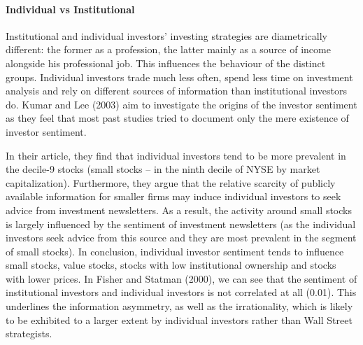 \paragraph{Individual vs Institutional}
Institutional and individual investors' investing strategies are diametrically different: the former as a profession, the latter mainly as a source of income alongside his professional job. This influences the behaviour of the distinct groups. Individual investors trade much less often, spend less time on investment analysis and rely on different sources of information than institutional investors do. Kumar and Lee (2003) aim to investigate the origins of the investor sentiment as they feel that most past studies tried to document only the mere existence of investor sentiment. 
\par
In their article, they find that individual investors tend to be more prevalent in the decile-9 stocks (small stocks – in the ninth decile of NYSE by market capitalization). Furthermore, they argue that the relative scarcity of publicly available information for smaller firms may induce individual investors to seek advice from investment newsletters. As a result, the activity around small stocks is largely influenced by the sentiment of investment newsletters (as the individual investors seek advice from this source and they are most prevalent in the segment of small stocks). In conclusion, individual investor sentiment tends to influence small stocks, value stocks, stocks with low institutional ownership and stocks with lower prices. In Fisher and Statman (2000), we can see that the sentiment of institutional investors and individual investors is not correlated at all (0.01). This underlines the information asymmetry, as well as the irrationality, which is likely to be exhibited to a larger extent by individual investors rather than Wall Street strategists.

